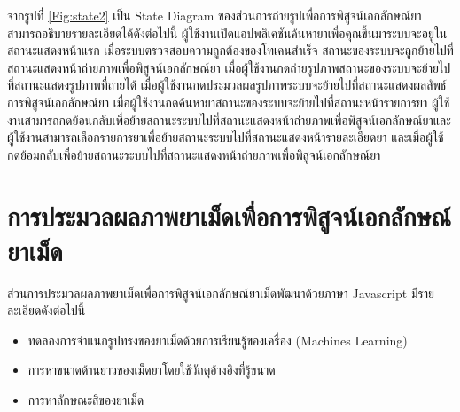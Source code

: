 	จากรูปที่ \ref{Fig:state2} เป็น State Diagram ของส่วนการถ่ายรูปเพื่อการพิสูจน์เอกลักษณ์ยา สามารถอธิบายรายละเอียดได้ดังต่อไปนี้ ผู้ใช้งานเปิดแอปพลิเคชันค้นหายาเพื่อคุณขึ้นมาระบบจะอยู่ในสถานะแสดงหน้าแรก เมื่อระบบตรวจสอบความถูกต้องของโทเคนสำเร็จ สถานะของระบบจะถูกย้ายไปที่สถานะแสดงหน้าถ่ายภาพเพื่อพิสูจน์เอกลักษณ์ยา เมื่อผู้ใช้งานกดถ่ายรูปภาพสถานะของระบบจะย้ายไปที่สถานะแสดงรูปภาพที่ถ่ายได้ เมื่อผู้ใช้งานกดประมวลผลรูปภาพระบบจะย้ายไปที่สถานะแสดงผลลัพธ์การพิสูจน์เอกลักษณ์ยา เมื่อผู้ใช้งานกดค้นหายาสถานะของระบบจะย้ายไปที่สถานะหน้ารายการยา ผู้ใช้งานสามารถกดย้อนกลับเพื่อย้ายสถานะระบบไปที่สถานะแสดงหน้าถ่ายภาพเพื่อพิสูจน์เอกลักษณ์ยาและผู้ใช้งานสามารถเลือกรายการยาเพื่อย้ายสถานะระบบไปที่สถานะแสดงหน้ารายละเอียดยา และเมื่อผู้ใช้กดย้อมกลับเพื่อย้ายสถานะระบบไปที่สถานะแสดงหน้าถ่ายภาพเพื่อพิสูจน์เอกลักษณ์ยา
\newpage
\section{การประมวลผลภาพยาเม็ดเพื่อการพิสูจน์เอกลักษณ์ยาเม็ด}
	ส่วนการประมวลผลภาพยาเม็ดเพื่อการพิสูจน์เอกลักษณ์ยาเม็ดพัฒนาด้วยภาษา Javascript มีรายละเอียดดังต่อไปนี้

	\begin{itemize}
		\item ทดลองการจำแนกรูปทรงของยาเม็ดด้วยการเรียนรู้ของเครื่อง (Machines Learning)
		\item การหาขนาดด้านยาวของเม็ดยาโดยใช้วัถตุอ้างอิงที่รู้ขนาด
		\item การหาลักษณะสีของยาเม็ด
	\end{itemize}

